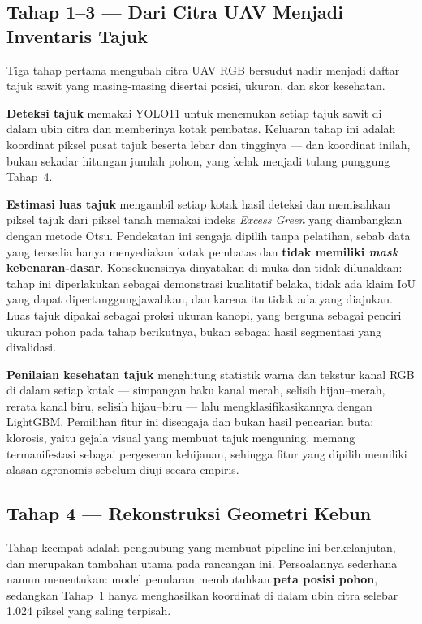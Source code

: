 \subsection{Tahap 1--3 --- Dari Citra UAV Menjadi Inventaris Tajuk}

Tiga tahap pertama mengubah citra UAV RGB bersudut nadir menjadi daftar tajuk sawit
yang masing-masing disertai posisi, ukuran, dan skor kesehatan.

\textbf{Deteksi tajuk} memakai YOLO11 untuk menemukan setiap tajuk sawit di dalam ubin
citra dan memberinya kotak pembatas. Keluaran tahap ini adalah koordinat piksel pusat
tajuk beserta lebar dan tingginya --- dan koordinat inilah, bukan sekadar hitungan
jumlah pohon, yang kelak menjadi tulang punggung Tahap~4.

\textbf{Estimasi luas tajuk} mengambil setiap kotak hasil deteksi dan memisahkan piksel
tajuk dari piksel tanah memakai indeks \textit{Excess Green} yang diambangkan dengan
metode Otsu. Pendekatan ini sengaja dipilih tanpa pelatihan, sebab data yang tersedia
hanya menyediakan kotak pembatas dan \textbf{tidak memiliki \textit{mask}
kebenaran-dasar}. Konsekuensinya dinyatakan di muka dan tidak dilunakkan: tahap ini
diperlakukan sebagai demonstrasi kualitatif belaka, tidak ada klaim IoU yang dapat
dipertanggungjawabkan, dan karena itu tidak ada yang diajukan. Luas tajuk dipakai
sebagai proksi ukuran kanopi, yang berguna sebagai penciri ukuran pohon pada tahap
berikutnya, bukan sebagai hasil segmentasi yang divalidasi.

\textbf{Penilaian kesehatan tajuk} menghitung statistik warna dan tekstur kanal RGB di
dalam setiap kotak --- simpangan baku kanal merah, selisih hijau--merah, rerata kanal
biru, selisih hijau--biru --- lalu mengklasifikasikannya dengan LightGBM. Pemilihan
fitur ini disengaja dan bukan hasil pencarian buta: klorosis, yaitu gejala visual yang
membuat tajuk menguning, memang termanifestasi sebagai pergeseran kehijauan, sehingga
fitur yang dipilih memiliki alasan agronomis sebelum diuji secara empiris.

\subsection{Tahap 4 --- Rekonstruksi Geometri Kebun}

Tahap keempat adalah penghubung yang membuat pipeline ini berkelanjutan, dan merupakan
tambahan utama pada rancangan ini. Persoalannya sederhana namun menentukan: model
penularan membutuhkan \textbf{peta posisi pohon}, sedangkan Tahap~1 hanya menghasilkan
koordinat di dalam ubin citra selebar 1.024 piksel yang saling terpisah.

